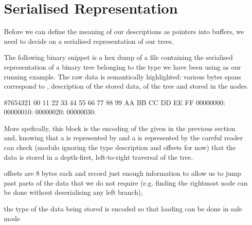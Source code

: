 \section{Serialised Representation}

Before we can define the meaning of our descriptions as pointers
into buffers, we need to decide on a serialised representation of
our trees.

The following binary snippet is a hex dump of a file containing
the serialised representation of a binary tree belonging to the
type we have been using as our running example.
%
The raw data is semantically highlighted: various bytes spans
correspond to
,
 description of the stored data,
 of the tree
and  stored in the nodes.

\begin{hexdump}
87654321  00 11 22 33 44 55 66 77 88 99 AA BB CC DD EE FF
00000000:   
00000010:   
00000020:         
00000030:     
\end{hexdump}

More spefically, this block is the encoding of the 
given in the previous section and,
%
knowing that a  is represented by 
and a  is represented by 
%
the careful reader can check
(modulo ignoring the type description and offsets for now)
that the data is stored in a depth-first, left-to-right traversal of the tree.



offsets are 8 bytes each and record just enough information to
allow us to jump past parts of the data that we do not require (e.g. finding
the rightmost node can be done without deserialising any left branch),

the type of the data being stored is encoded so that loading
can be done in safe mode
